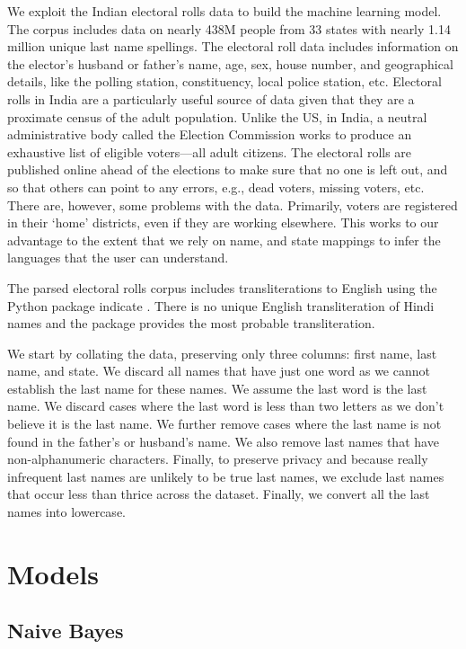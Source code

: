 \documentclass[11pt,  letterpaper]{article}
\begin{document}
We exploit the Indian electoral rolls data \citep{DVN/OG47IV_2023, DVN/MUEGDT_2018} to build the machine learning model. The corpus includes data on nearly 438M people from 33 states with nearly 1.14 million unique last name spellings. The electoral roll data includes information on the elector's husband or father’s name, age, sex, house number, and geographical details, like the polling station, constituency, local police station, etc. Electoral rolls in India are a particularly useful source of data given that they are a proximate census of the adult population. Unlike the US, in India, a neutral administrative body called the Election Commission works to produce an exhaustive list of eligible voters—all adult citizens. The electoral rolls are published online ahead of the elections to make sure that no one is left out, and so that others can point to any errors, e.g., dead voters, missing voters, etc. There are, however, some problems with the data. Primarily, voters are registered in their `home’ districts, even if they are working elsewhere. This works to our advantage to the extent that we rely on name, and state mappings to infer the languages that the user can understand.

The parsed electoral rolls corpus \citep{DVN/MUEGDT_2018} includes transliterations to English using the Python package indicate \citep{Chintalapati_Indicate_Transliterate_Indic_2022}. There is no unique English transliteration of Hindi names and the package provides the most probable transliteration. 

We start by collating the data, preserving only three columns: first name, last name, and state. We discard all names that have just one word as we cannot establish the last name for these names. We assume the last word is the last name. We discard cases where the last word is less than two letters as we don't believe it is the last name. We further remove cases where the last name is not found in the father's or husband's name. We also remove last names that have non-alphanumeric characters. Finally, to preserve privacy and because really infrequent last names are unlikely to be true last names, we exclude last names that occur less than thrice across the dataset. Finally, we convert all the last names into lowercase. 

\section{Models}

\subsection{Naive Bayes}
\end{document}
